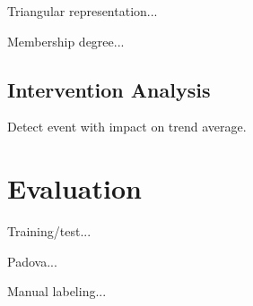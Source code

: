 Triangular representation...

Membership degree...

\subsection{Intervention Analysis}

Detect event with impact on trend average.

\section{Evaluation}

Training/test...

Padova...

Manual labeling...
